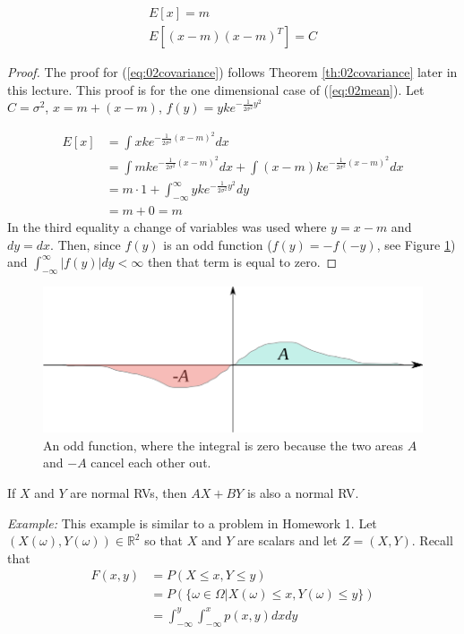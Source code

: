\documentclass[lecture,12pt,]{pcms-l}
\begin{document}
\begin{theorem}
\label{th:02mean}
\begin{align}
\label{eq:02mean}
E[x] = m \\
\label{eq:02covariance}
E[(x-m)(x-m)^T] = C
\end{align}
\end{theorem}
\begin{proof}
The proof for (\ref{eq:02covariance}) follows Theorem \ref{th:02covariance} later in this lecture. This proof is for the one dimensional case of (\ref{eq:02mean}). Let $C=\sigma^2$, $x=m+(x-m)$, $f(y)=yke^{-\frac{1}{2\sigma^2}y^2}$

\begin{align*}
E[x] &= \int xke^{-\frac{1}{2\sigma^2}(x-m)^2}dx \\
&= \int mke^{-\frac{1}{2\sigma^2}(x-m)^2}dx + \int(x-m)ke^{-\frac{1}{2\sigma^2}(x-m)^2}dx \\
&= m \cdot 1 + \int_{-\infty}^\infty yke^{-\frac{1}{2\sigma^2}y^2}dy \\
&= m + 0 = m
\end{align*}
In the third equality a change of variables was used where $y=x-m$ and $dy=dx$. Then, since $f(y)$ is an odd function ($f(y)=-f(-y)$, see Figure \ref{fig:02oddFunction}) and $\int_{-\infty}^\infty|f(y)|dy < \infty$ then that term is equal to zero.
\end{proof}
\begin{figure}[ht!]
	\centering
	\includegraphics[width=.5\textwidth]{images/02oddFunction}
	\caption{An odd function, where the integral is zero because the two areas $A$ and $-A$ cancel each other out.}
	\label{fig:02oddFunction}
\end{figure}

\begin{theorem}
If $X$ and $Y$ are normal RVs, then $AX+BY$ is also a normal RV.
\end{theorem}

\textit{Example:} This example is similar to a problem in Homework 1. Let $(X(\omega),Y(\omega)) \in \mathbb{R}^2$ so that $X$ and $Y$ are scalars and let $Z=(X,Y)$. Recall that
\begin{align*}
F(x,y) &= P(X\leq x, Y\leq y) \\
&= P(\lbrace \omega\in\Omega | X(\omega)\leq x, Y(\omega)\leq y\rbrace) \\
&= \int_{-\infty}^y\int_{-\infty}^x p(x,y)dxdy
\end{align*}
\end{document}
